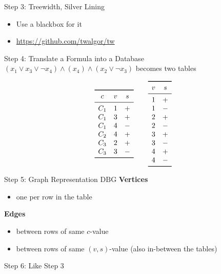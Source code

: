 \documentclass[aspectratio=169]{beamer}
\newcommand{\DBG}{\mathrm{DBG}}
\begin{document}
\begin{frame}{Step 3: Treewidth, Silver Lining}
\begin{itemize}
	\item Use a blackbox for it
	\item \url{https://github.com/twalgor/tw}
\end{itemize}
\end{frame}

\begin{frame}{Step 4: Translate a Formula into a Database}
$(x_1\lor x_3\lor \lnot x_4)\land (x_4)\land (x_2\lor \lnot x_3)$ becomes two tables

$$\begin{array}{ccc}\toprule
		c & v & s \\\midrule
		C_1 & 1 & +\\
		C_1 & 3 & +\\
		C_1 & 4 &-\\
		C_2 & 4 &+\\
		C_3 & 2 &+\\
		C_3 & 3 &-\\\bottomrule
\end{array}\qquad
\begin{array}{cc}\toprule
		v & s \\\midrule
		1 &+\\
		1 &-\\
		2 &+\\
		2 &-\\
		3 &+\\
		3 &-\\
		4 &+\\
		4 &-	\\\bottomrule
\end{array}
$$

\end{frame}

\begin{frame}{Step 5: Graph Representation $\DBG$}
\textbf{Vertices}
\begin{itemize}
	\item one per row in the table
\end{itemize}\bigskip

\textbf{Edges}
\begin{itemize}
	\item between rows of same $c$-value
	\item between rows of same $(v,s)$-value (also in-between the tables)
\end{itemize}

\alert{Step 6:} Like Step 3
\end{frame}
\end{document}
